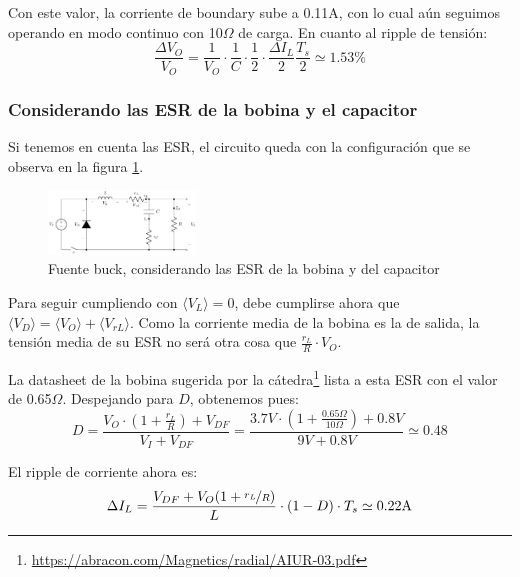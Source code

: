 \documentclass[e4_tp1_main.tex]{subfiles}
\begin{document}
Con este valor, la corriente de boundary sube a 0.11A, con lo cual a\'un seguimos operando en modo continuo con 10$\Omega$ de carga. En cuanto al ripple de tensi\'on:
\begin{equation}
\frac{\Delta V_O}{V_O}  
= \frac{1}{V_O} 
\cdot \frac{1}{C} \cdot \frac{1}{2} \cdot \frac{\Delta I_L}{2} \frac{T_s}{2}
\simeq 1.53 \%
\label{eq:result-ripple-diodo}
\end{equation}


\subsubsection{Considerando las ESR de la bobina y el capacitor}

Si tenemos en cuenta las ESR, el circuito queda con la configuraci\'on que se observa en la figura \ref{fig:buck-esrs}.

\begin{figure}
	\centering
	\includegraphics[width=0.35\textwidth]{images/ej2/buck_esrs.pdf}
	\caption{Fuente buck, considerando las ESR de la bobina y del capacitor}
	\label{fig:buck-esrs}
\end{figure}


Para seguir cumpliendo con $\langle V_L \rangle = 0$, debe cumplirse ahora que $\langle V_D \rangle = \langle V_O \rangle + \langle V_{rL} \rangle$. Como la corriente media de la bobina es la de salida, la tensi\'on media de su ESR no ser\'a otra cosa que $\frac{r_L}{R} \cdot V_O$. 

La datasheet de la bobina sugerida por la 
c\'atedra\footnote{
	\url{https://abracon.com/Magnetics/radial/AIUR-03.pdf}
} lista a esta ESR con el valor de 0.65$\Omega$.
Despejando para $D$, obtenemos pues:
\begin{equation}
	D = \frac{V_O \cdot \left( 1+ \frac{r_L}{R}\right)+ V_{DF}}{V_I + V_{DF}} 
= \frac{3.7V \cdot \left( 1+ \frac{0.65\Omega}{10\Omega}\right) + 0.8V}{9V + 0.8V} 
\simeq 0.48 
\end{equation}


El ripple de corriente ahora es:
\begin{equation}
	\Delta I_L = \frac{V_{DF} + V_O(1+\nicefrac{r_L}{R})}{L} \cdot (1-D) \cdot T_s \simeq 0.22\text{A} 
\end{equation}
\end{document}
